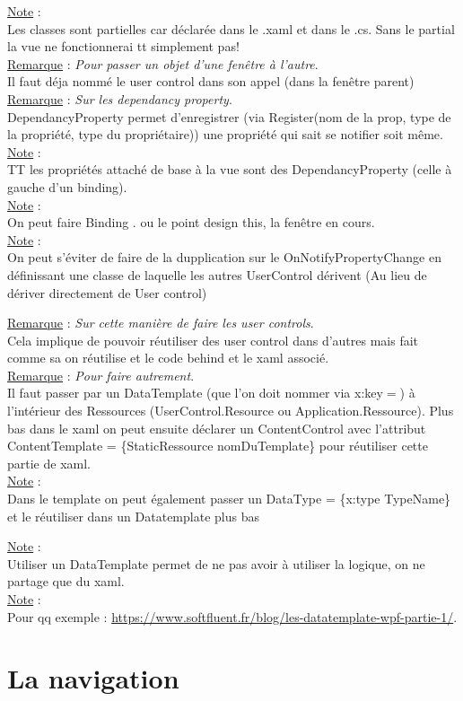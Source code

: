 \documentclass[a4paper,12pt,twoside]{article}
\newcommand{\incode}[1]{{\footnotesize\ttfamily #1}} %
\newcommand{\rem}[2]{\noindent\underline{Remarque} : \textit{#1}.\\ \indent #2}
\newcommand{\note}[1]{\noindent\underline{Note} : \\ \indent #1}
\begin{document}
\note{Les classes sont partielles car déclarée dans le .xaml et dans le .cs. Sans le \incode{partial} la vue ne fonctionnerai tt simplement pas!}\\

\rem{Pour passer un objet d'une fenêtre à l'autre}{Il faut déja nommé le user control dans son appel (dans la fenêtre parent)}\\

\rem{Sur les dependancy property}{DependancyProperty permet d'enregistrer (via Register(nom de la prop, type de la propriété, type du propriétaire)) une propriété qui sait se notifier soit même.}\\

\note{TT les propriétés attaché de base à la vue sont des DependancyProperty (celle à gauche d'un binding).}\\

\note{On peut faire Binding . ou le point design this, la fenêtre en cours.}\\

\note{On peut s'éviter de faire de la dupplication sur le OnNotifyPropertyChange en définissant une classe de laquelle les autres UserControl dérivent (Au lieu de dériver directement de User control)}

\rem{Sur cette manière de faire les user controls}{Cela implique de pouvoir réutiliser des user control dans d'autres mais fait comme sa on réutilise et le code behind et le xaml associé.}\\

\rem{Pour faire autrement}{Il faut passer par un DataTemplate (que l'on doit nommer via x:key$=$) à l'intérieur des Ressources (UserControl.Resource ou Application.Ressource). Plus bas dans le xaml on peut ensuite déclarer un ContentControl avec l'attribut ContentTemplate = \{StaticRessource nomDuTemplate\} pour réutiliser cette partie de xaml.}\\

\note{Dans le template on peut également passer un DataType = \{x:type TypeName\} et le réutiliser dans un Datatemplate plus bas}

\note{Utiliser un DataTemplate permet de ne pas avoir à utiliser la logique, on ne partage que du xaml.}\\

\note{Pour qq exemple : \url{https://www.softfluent.fr/blog/les-datatemplate-wpf-partie-1/}.}\\

\section{La navigation}
\end{document}
